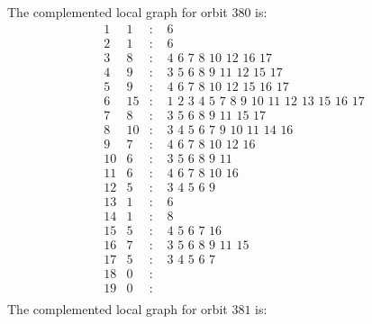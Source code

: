 \documentclass[12pt]{article}
\begin{document}
The complemented local graph for orbit $380$ is:
\begin{equation*}
\begin{array}{rrcl}
1&1&:&\,\,6\\
2&1&:&\,\,6\\
3&8&:&\,\,4\,\,6\,\,7\,\,8\,\,10\,\,12\,\,16\,\,17\\
4&9&:&\,\,3\,\,5\,\,6\,\,8\,\,9\,\,11\,\,12\,\,15\,\,17\\
5&9&:&\,\,4\,\,6\,\,7\,\,8\,\,10\,\,12\,\,15\,\,16\,\,17\\
6&15&:&\,\,1\,\,2\,\,3\,\,4\,\,5\,\,7\,\,8\,\,9\,\,10\,\,11\,\,12\,\,13\,\,15\,\,16\,\,17\\
7&8&:&\,\,3\,\,5\,\,6\,\,8\,\,9\,\,11\,\,15\,\,17\\
8&10&:&\,\,3\,\,4\,\,5\,\,6\,\,7\,\,9\,\,10\,\,11\,\,14\,\,16\\
9&7&:&\,\,4\,\,6\,\,7\,\,8\,\,10\,\,12\,\,16\\
10&6&:&\,\,3\,\,5\,\,6\,\,8\,\,9\,\,11\\
11&6&:&\,\,4\,\,6\,\,7\,\,8\,\,10\,\,16\\
12&5&:&\,\,3\,\,4\,\,5\,\,6\,\,9\\
13&1&:&\,\,6\\
14&1&:&\,\,8\\
15&5&:&\,\,4\,\,5\,\,6\,\,7\,\,16\\
16&7&:&\,\,3\,\,5\,\,6\,\,8\,\,9\,\,11\,\,15\\
17&5&:&\,\,3\,\,4\,\,5\,\,6\,\,7\\
18&0&:&\\
19&0&:&\\
\end{array}
\end{equation*}
The complemented local graph for orbit $381$ is:
\end{document}
